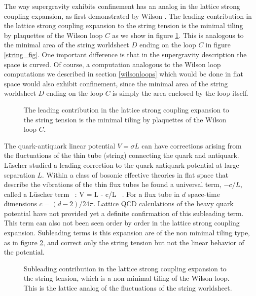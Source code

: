 The way supergravity exhibits confinement has an analog in the lattice
strong coupling expansion, as first demonstrated by Wilson
\cite{Wilson:1974co}.  The leading contribution in the lattice strong
coupling expansion to the string tension is the minimal tiling by
plaquettes of the Wilson loop $C$ as we show in figure \ref{strong}.
This is analogous to the minimal area of the string worldsheet $D$
ending on the loop $C$ in figure \ref{string_fig}. One important
difference is that in the supergravity description the space is
curved.  Of course, a computation analogous to the Wilson loop
computations we described in section \ref{wilsonloops}
which would be done in flat
space would also
exhibit confinement, since the minimal area of the string worldsheet
$D$ ending on the loop $C$ is simply the area enclosed by the loop
itself.


\begin{figure}[htb]
\begin{center}
\epsfxsize=1.5in\leavevmode{}
\end{center}

\caption{The leading contribution in the lattice 
strong coupling expansion to the string tension
is the minimal tiling by plaquettes of the Wilson loop $C$.
}
\label{strong}
\end{figure} 

The quark-antiquark linear potential $V = \sigma L$ can have
corrections arising from the fluctuations of the thin tube (string)
connecting the quark and antiquark.  L\"uscher studied a leading
correction to the quark-antiquark potential at large separation $L$.
Within a class of bosonic effective theories in flat space that
describe the vibrations of the thin flux tubes he found a universal
term, $-c/L$, called a L\"uscher term \cite{Luscher:1981sb}~:
\beq
V = \sigma L - c/L \ .
\eeq
For a flux tube in $d$ space-time dimensions $c= (d-2)/24 \pi$.
Lattice QCD calculations of the heavy quark potential have not
provided yet a definite confirmation of this subleading term.  This
term can also not been seen order by order in the lattice strong
coupling expansion.  Subleading terms is this expansion are of the non
minimal tiling type, as in figure \ref{strong2}, and correct only the
string tension but not the linear behavior of the potential.


\begin{figure}[htb]
\begin{center}
\epsfxsize=2in\leavevmode{}
\end{center}
\caption{Subleading contribution in the lattice strong coupling 
expansion to the string tension,
which is 
a non minimal tiling of the Wilson loop. This is the lattice analog
of the fluctuations of the string worldsheet. 
}
\label{strong2}
\end{figure} 


